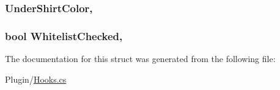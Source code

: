 \subsubsection[{Under\+Shirt\+Color}]{ Under\+Shirt\+Color\hspace{0.3cm}{\ttfamily [get]}, {\ttfamily [set]}}\label{structOTA_1_1Plugin_1_1HookArgs_1_1PlayerDataReceived_ac194dfe292333d5f5e6ff1a015e2fa80}
\hypertarget{structOTA_1_1Plugin_1_1HookArgs_1_1PlayerDataReceived_a88a43757634f81abfd2bbae1b4e2d439}{}
\subsubsection[{Whitelist\+Checked}]{\setlength{\rightskip}{0pt plus 5cm}bool Whitelist\+Checked\hspace{0.3cm}{\ttfamily [get]}, {\ttfamily [set]}}\label{structOTA_1_1Plugin_1_1HookArgs_1_1PlayerDataReceived_a88a43757634f81abfd2bbae1b4e2d439}


The documentation for this struct was generated from the following file\+:\begin{DoxyCompactItemize}
\item 
Plugin/\hyperlink{Hooks_8cs}{Hooks.\+cs}\end{DoxyCompactItemize}
